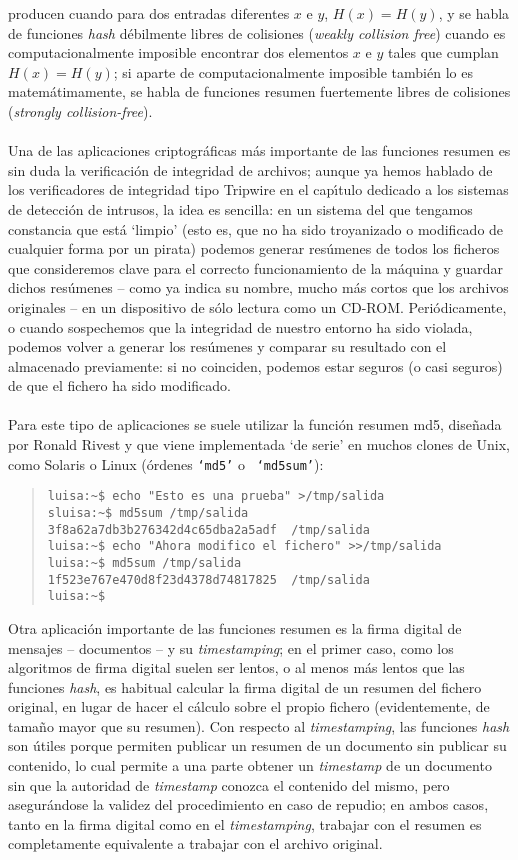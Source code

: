 producen cuando para dos entradas diferentes $x$ e $y$, $H(x)=H(y)$, y se habla 
de
funciones {\it hash} d\'ebilmente libres de colisiones ({\it weakly collision
free}) cuando es 
computacionalmente imposible encontrar dos elementos $x$ e $y$ tales que 
cumplan 
$H(x)=H(y)$; si aparte de computacionalmente imposible tambi\'en lo es
matem\'atimamente, se habla de funciones resumen fuertemente libres de 
colisiones ({\it strongly collision-free}).\\
\\Una de las aplicaciones criptogr\'aficas m\'as importante de las funciones 
resumen es sin duda la verificaci\'on de integridad de archivos; aunque ya
hemos hablado de los verificadores de integridad tipo Tripwire en el 
cap\'{\i}tulo dedicado a los sistemas de detecci\'on de intrusos, la idea es
sencilla: en un sistema del que tengamos constancia que est\'a `limpio' (esto
es, que no ha sido troyanizado o modificado de cualquier forma por un pirata)
podemos generar res\'umenes de todos los ficheros que consideremos clave para
el correcto funcionamiento de la m\'aquina y guardar dichos res\'umenes --
como ya indica su nombre, mucho m\'as cortos que los archivos originales -- en
un dispositivo de s\'olo lectura como un CD-ROM. Peri\'odicamente, o cuando
sospechemos que la integridad de nuestro entorno ha sido violada, podemos volver
a generar los res\'umenes y comparar su resultado con el almacenado previamente:
si no coinciden, podemos estar seguros (o casi seguros) de que el fichero ha
sido modificado.\\
\\Para este tipo de aplicaciones se suele utilizar la funci\'on resumen {\sc
md5}, dise\~nada por Ronald Rivest y que viene implementada `de serie' en 
muchos clones de Unix, como Solaris o Linux (\'ordenes {\tt `md5'} o {\tt
`md5sum'}):
\begin{quote}
\begin{verbatim}
luisa:~$ echo "Esto es una prueba" >/tmp/salida
sluisa:~$ md5sum /tmp/salida 
3f8a62a7db3b276342d4c65dba2a5adf  /tmp/salida
luisa:~$ echo "Ahora modifico el fichero" >>/tmp/salida
luisa:~$ md5sum /tmp/salida 
1f523e767e470d8f23d4378d74817825  /tmp/salida
luisa:~$ 
\end{verbatim}
\end{quote}
Otra aplicaci\'on importante de las funciones resumen es la firma digital de
mensajes -- documentos -- y su {\it timestamping}; en el primer caso, como los 
algoritmos de firma digital suelen ser lentos, o al menos
m\'as lentos que las funciones {\it hash}, es habitual calcular la firma
digital de un resumen del fichero original, en lugar de hacer el c\'alculo 
sobre el propio fichero (evidentemente, de tama\~no mayor que su resumen). Con
respecto al {\it timestamping}, las funciones {\it hash} son \'utiles porque 
permiten publicar un resumen de un documento sin publicar su contenido, lo cual
permite a una parte obtener un {\it timestamp} de un documento sin que la
autoridad de {\it timestamp} conozca el contenido del mismo, pero asegur\'andose
la validez del procedimiento en caso de repudio; en ambos casos, tanto en la
firma digital como en el {\it timestamping}, trabajar con el resumen es 
completamente equivalente a trabajar con el archivo original.
